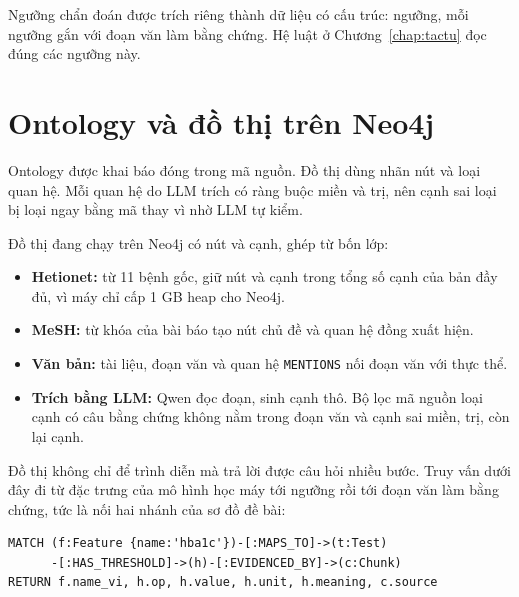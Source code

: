 Ngưỡng chẩn đoán được trích riêng thành dữ liệu có cấu trúc:  ngưỡng, mỗi ngưỡng gắn với đoạn văn làm bằng chứng. Hệ luật ở Chương~\ref{chap:tactu} đọc đúng các ngưỡng này.

\section{Ontology và đồ thị trên Neo4j}

Ontology được khai báo đóng trong mã nguồn. Đồ thị dùng  nhãn nút và  loại quan hệ. Mỗi quan hệ do LLM trích có ràng buộc miền và trị, nên cạnh sai loại bị loại ngay bằng mã thay vì nhờ LLM tự kiểm.


Đồ thị đang chạy trên Neo4j có  nút và  cạnh, ghép từ bốn lớp:

\begin{itemize}
  \item \textbf{Hetionet:} từ 11 bệnh gốc, giữ  nút và  cạnh trong tổng số  cạnh của bản đầy đủ, vì máy chỉ cấp 1 GB heap cho Neo4j.
  \item \textbf{MeSH:} từ khóa của bài báo tạo nút chủ đề và quan hệ đồng xuất hiện.
  \item \textbf{Văn bản:} tài liệu, đoạn văn và quan hệ \texttt{MENTIONS} nối đoạn văn với thực thể.
  \item \textbf{Trích bằng LLM:} Qwen đọc  đoạn, sinh  cạnh thô. Bộ lọc mã nguồn loại  cạnh có câu bằng chứng không nằm trong đoạn văn và  cạnh sai miền, trị, còn lại  cạnh.
\end{itemize}

Đồ thị không chỉ để trình diễn mà trả lời được câu hỏi nhiều bước. Truy vấn dưới đây đi từ đặc trưng của mô hình học máy tới ngưỡng rồi tới đoạn văn làm bằng chứng, tức là nối hai nhánh của sơ đồ đề bài:

\begin{verbatim}
MATCH (f:Feature {name:'hba1c'})-[:MAPS_TO]->(t:Test)
      -[:HAS_THRESHOLD]->(h)-[:EVIDENCED_BY]->(c:Chunk)
RETURN f.name_vi, h.op, h.value, h.unit, h.meaning, c.source
\end{verbatim}

